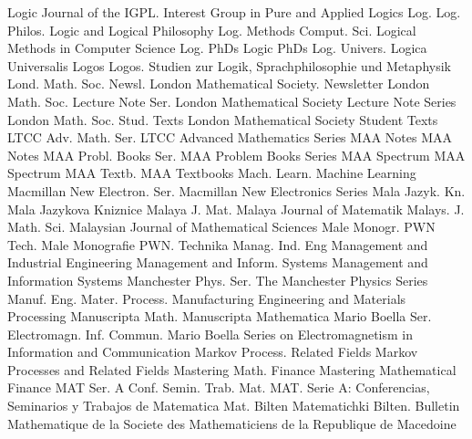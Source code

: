 {Logic Journal of the IGPL. Interest Group in Pure and Applied Logics}
{Log. Log. Philos.}
{Logic and Logical Philosophy}
{Log. Methods Comput. Sci.}
{Logical Methods in Computer Science}
{Log. PhDs}
{Logic PhDs}
{Log. Univers.}
{Logica Universalis}
{Logos}
{Logos. Studien zur Logik, Sprachphilosophie und Metaphysik}
{Lond. Math. Soc. Newsl.}
{London Mathematical Society. Newsletter}
{London Math. Soc. Lecture Note Ser.}
{London Mathematical Society Lecture Note Series}
{London Math. Soc. Stud. Texts}
{London Mathematical Society Student Texts}
{LTCC Adv. Math. Ser.}
{LTCC Advanced Mathematics Series}
{MAA Notes}
{MAA Notes}
{MAA Probl. Books Ser.}
{MAA Problem Books Series}
{MAA Spectrum}
{MAA Spectrum}
{MAA Textb.}
{MAA Textbooks}
{Mach. Learn.}
{Machine Learning}
{Macmillan New Electron. Ser.}
{Macmillan New Electronics Series}
{Mala Jazyk. Kn.}
{Mala Jazykova Kniznice}
{Malaya J. Mat.}
{Malaya Journal of Matematik}
{Malays. J. Math. Sci.}
{Malaysian Journal of Mathematical Sciences}
{Male Monogr. PWN Tech.}
{Male Monografie PWN. Technika}
{Manag. Ind. Eng}
{Management and Industrial Engineering}
{Management and Inform. Systems}
{Management and Information Systems}
{Manchester Phys. Ser.}
{The Manchester Physics Series}
{Manuf. Eng. Mater. Process.}
{Manufacturing Engineering and Materials Processing}
{Manuscripta Math.}
{Manuscripta Mathematica}
{Mario Boella Ser. Electromagn. Inf. Commun.}
{Mario Boella Series on Electromagnetism in Information and Communication}
{Markov Process. Related Fields}
{Markov Processes and Related Fields}
{Mastering Math. Finance}
{Mastering Mathematical Finance}
{MAT Ser. A Conf. Semin. Trab. Mat.}
{MAT. Serie A: Conferencias, Seminarios y Trabajos de Matematica}
{Mat. Bilten}
{Matematichki Bilten. Bulletin Mathematique de la Societe des Mathematiciens de la Republique de Macedoine}
